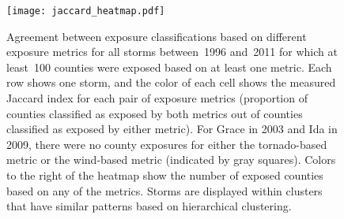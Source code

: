 \clearpage

\begin{figure}%
	\centering 
	\texttt{[image: jaccard\_heatmap.pdf]}
	\caption{Agreement between exposure
	classifications based on different exposure metrics for all storms
	between~1996 and~2011 for which at least~100 counties were exposed
	based on at least one metric.  Each row shows one storm, and the color
	of each cell shows the measured Jaccard index for each pair of exposure
	metrics (proportion of counties classified as exposed by both metrics
	out of counties classified as exposed by either metric). For 
	Grace in 2003 and Ida in 2009, there were no county exposures for
	either the tornado-based metric or the wind-based metric (indicated 
	by gray squares). Colors to the right of the
	heatmap show the number of exposed counties
	based on any of the metrics. Storms are displayed
	within clusters that have similar patterns based on hierarchical 
	clustering.}
\label{fig:jaccard} 
\end{figure}


\begin{comment}
\clearpage

\begin{figure*}%
\centering
\texttt{[image: topelecdependexposure]}
\caption{Study counties with the highest expected rate of physical exposure per year among
	 electricity-dependent Medicare beneficiaries based on each exposure metric. 
	 The color of each bar indicates the number of Medicare beneficiaries in the 
	 county reliant on electricity-dependent medical and assistive equipment as 
	 of July~2017. The length of each bar shows the average expected rate of physical exposure
	 to tropical cyclones among this population based on a given exposure metric, i.e., 
	 the expected number of these electricity-dependent Medicare beneficiaries exposed 
	 to tropical storms per year based on that metric (Table 1).}
\label{fig:topelecdependexposure}
\end{figure*}

\end{comment}
